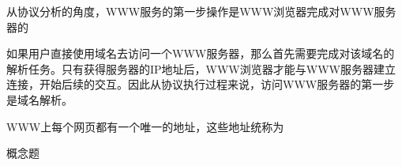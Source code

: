 \question 从协议分析的角度，WWW服务的第一步操作是WWW浏览器完成对WWW服务器的
\par{}
\begin{solution}如果用户直接使用域名去访问一个WWW服务器，那么首先需要完成对该域名的解析任务。只有获得服务器的IP地址后，WWW浏览器才能与WWW服务器建立连接，开始后续的交互。因此从协议执行过程来说，访问WWW服务器的第一步是域名解析。
\end{solution}
\question WWW上每个网页都有一个唯一的地址，这些地址统称为
\par{}
\begin{solution}概念题
\end{solution}
